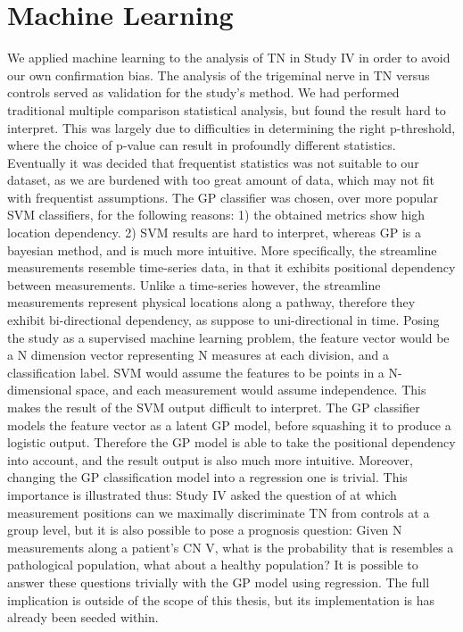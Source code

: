 \section{Machine Learning}

We applied machine learning to the analysis of TN in Study IV in order to avoid our own confirmation bias. The analysis of the trigeminal nerve in TN versus controls served as validation for the study's method. We had performed traditional multiple comparison statistical analysis, but found the result hard to interpret. This was largely due to difficulties in determining the right p-threshold, where the choice of p-value can result in profoundly different statistics. Eventually it was decided that frequentist statistics was not suitable to our dataset, as we are burdened with too great amount of data, which may not fit with frequentist assumptions. The GP classifier was chosen, over more popular SVM classifiers, for the following reasons: 1) the obtained metrics show high location dependency. 2) SVM results are hard to interpret, whereas GP is a bayesian method, and is much more intuitive. More specifically, the streamline measurements resemble time-series data, in that it exhibits positional dependency between measurements. Unlike a time-series however, the streamline measurements represent physical locations along a pathway, therefore they exhibit bi-directional dependency, as suppose to uni-directional in time. Posing the study as a supervised machine learning problem, the feature vector would be a N dimension vector representing N measures at each division, and a classification label. SVM would assume the features to be points in a N-dimensional space, and each measurement would assume independence. This makes the result of the SVM output difficult to interpret. The GP classifier models the feature vector as a latent GP model, before squashing it to produce a logistic output. Therefore the GP model is able to take the positional dependency into account, and the result output is also much more intuitive. Moreover, changing the GP classification model into a regression one is trivial. This importance is illustrated thus: Study IV asked the question of at which measurement positions can we maximally discriminate TN from controls at a group level, but it is also possible to pose a prognosis question: Given N measurements along a patient's CN V, what is the probability that is resembles a pathological population, what about a healthy population? It is possible to answer these questions trivially with the GP model using regression. The full implication is outside of the scope of this thesis, but its implementation is has already been seeded within. 

